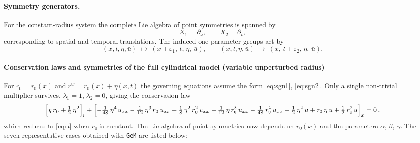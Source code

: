 \documentclass[alpha-refs, 12pt]{wiley-article}
\newcommand{\eps}{\varepsilon}
\begin{document}
\paragraph{Symmetry generators.} For the constant-radius system the complete Lie algebra of point symmetries is spanned by
\[
  X_{1}=\partial_{x},
  \qquad
  X_{2}=\partial_{t},
\]
corresponding to spatial and temporal translations. The induced one-parameter groups act by
\[
  (x,t,\eta,\bar{u})\;\mapsto\;
  (x+\eps_{1},\,t,\,\eta,\,\bar{u}),
  \qquad
  (x,t,\eta,\bar{u})\;\mapsto\;
  (x,\,t+\eps_{2},\,\eta,\,\bar{u}).
\]

\paragraph{Conservation laws and symmetries of the full cylindrical model (variable unperturbed radius)}\label{par:variable_r0} For $r_{0}=r_{0}(x)$ and $r^{w}=r_{0}(x)+\eta(x,t)$ the governing equations assume the form \eqref{eq:sgn1}, \eqref{eq:sgn2}. Only a single non-trivial multiplier survives, $\lambda_{1}=1$, $\lambda_{2}=0$, giving the conservation law
\begin{equation}
  \Bigl[\eta\,r_{0}+\tfrac12\,\eta^{2}\Bigr]_{t}
  +\Bigl[
        -\tfrac1{48}\,\eta^{4}\,\bar{u}_{xx}
        -\tfrac1{12}\,\eta^{3}\,r_{0}\,\bar{u}_{xx}
        -\tfrac18\,\eta^{2}\,r_{0}^{2}\,\bar{u}_{xx}
        -\tfrac1{12}\,\eta\,r_{0}^{3}\,\bar{u}_{xx}
        -\tfrac1{48}\,r_{0}^{4}\,\bar{u}_{xx}
        \\[2pt]
        +\tfrac12\,\eta^{2}\,\bar{u}
        +r_{0}\,\eta\,\bar{u}
        +\tfrac12\,r_{0}^{2}\,\bar{u}
  \Bigr]_{x}=0\,,
\end{equation}
which reduces to \eqref{eq:a} when $r_{0}$ is constant. The Lie algebra of point symmetries now depends on $r_{0}(x)$ and the parameters $\alpha$, $\beta$, $\gamma$. The seven representative cases obtained with \texttt{GeM} are listed below:
\end{document}
